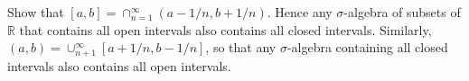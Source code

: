 Show that \([a,b]=\cap_{n=1}^{\infty}(a-1/n,b+1/n)\). Hence any
\(\sigma\)-algebra of subsets of \(\mathbb{R}\) that contains all open intervals
also contains all closed intervals. Similarly,
\((a,b)=\cup_{n+1}^{\infty}[a+1/n,b-1/n]\), so that any \(\sigma\)-algebra
containing all closed intervals also contains all open intervals.
